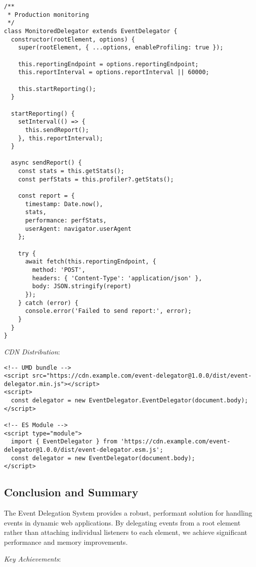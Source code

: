 \documentclass[11pt]{article}
\begin{document}
\begin{verbatim}
/**
 * Production monitoring
 */
class MonitoredDelegator extends EventDelegator {
  constructor(rootElement, options) {
    super(rootElement, { ...options, enableProfiling: true });
    
    this.reportingEndpoint = options.reportingEndpoint;
    this.reportInterval = options.reportInterval || 60000;
    
    this.startReporting();
  }
  
  startReporting() {
    setInterval(() => {
      this.sendReport();
    }, this.reportInterval);
  }
  
  async sendReport() {
    const stats = this.getStats();
    const perfStats = this.profiler?.getStats();
    
    const report = {
      timestamp: Date.now(),
      stats,
      performance: perfStats,
      userAgent: navigator.userAgent
    };
    
    try {
      await fetch(this.reportingEndpoint, {
        method: 'POST',
        headers: { 'Content-Type': 'application/json' },
        body: JSON.stringify(report)
      });
    } catch (error) {
      console.error('Failed to send report:', error);
    }
  }
}
\end{verbatim}

\emph{CDN Distribution}:

\begin{verbatim}
<!-- UMD bundle -->
<script src="https://cdn.example.com/event-delegator@1.0.0/dist/event-delegator.min.js"></script>
<script>
  const delegator = new EventDelegator.EventDelegator(document.body);
</script>

<!-- ES Module -->
<script type="module">
  import { EventDelegator } from 'https://cdn.example.com/event-delegator@1.0.0/dist/event-delegator.esm.js';
  const delegator = new EventDelegator(document.body);
</script>
\end{verbatim}
\subsection{Conclusion and Summary}
\label{sec:org9ccd437}

The Event Delegation System provides a robust, performant solution for handling events in dynamic web applications. By delegating events from a root element rather than attaching individual listeners to each element, we achieve significant performance and memory improvements.

\emph{Key Achievements}:
\end{document}
